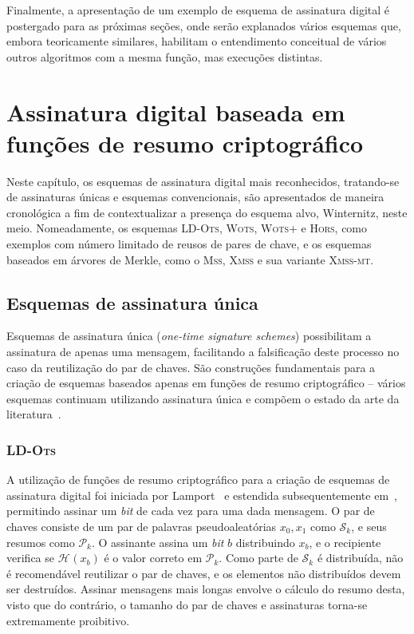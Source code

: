 \documentclass[12pt,notitlepage]{report}
\newcommand{\pk}{\mathcal{P}_k}
\newcommand{\sk}{\mathcal{S}_k}
\newcommand{\hash}[2][]{\mathcal{H}^{#1}(#2)}
\newcommand{\lots}{\textsc{LD-Ots}}
\newcommand{\wots}{\textsc{Wots}}
\newcommand{\wotsplus}{\textsc{Wots+}}
\newcommand{\hors}{\textsc{Hors}}
\newcommand{\mss}{\textsc{Mss}}
\newcommand{\xmss}{\textsc{Xmss}}
\newcommand{\xmssmt}{\textsc{Xmss-mt}}
\begin{document}
Finalmente, a apresentação de um exemplo de esquema de assinatura digital é
postergado para as próximas seções, onde serão explanados vários esquemas que,
embora teoricamente similares, habilitam o entendimento conceitual de vários
outros algoritmos com a mesma função, mas execuções distintas.

\chapter{Assinatura digital baseada em funções de resumo criptográfico}
\label{chapter:hashsig}

Neste capítulo, os esquemas de assinatura digital mais reconhecidos,
tratando-se de assinaturas únicas e esquemas convencionais, são apresentados
de maneira cronológica a fim de contextualizar a presença do esquema alvo,
Winternitz, neste meio. Nomeadamente, os esquemas \lots{}, \wots{},
\wotsplus{} e \hors{}, como exemplos com número limitado de reusos de pares
de chave, e os esquemas baseados em árvores de Merkle, como o \mss{}, \xmss{}
e sua variante \xmssmt{}.

\section{Esquemas de assinatura única}
\label{section:onetime}

Esquemas de assinatura única (\emph{one-time signature schemes}) possibilitam a
assinatura de apenas uma mensagem, facilitando a falsificação deste processo no
caso da reutilização do par de chaves. São construções fundamentais para a
criação de esquemas baseados apenas em funções de resumo criptográfico --
vários esquemas continuam utilizando assinatura única e compõem o estado da
arte da literatura~\cite{sphincsplus,irtf-cfrg-xmss-hash-based-signatures-12}.

\subsection{\lots{}}
\label{subsection:ldots}

A utilização de funções de resumo criptográfico para a criação de esquemas de
assinatura digital foi iniciada por Lamport~\cite{lamport1979constructing}
e estendida subsequentemente em~\cite{Diffie:2006:NDC:2263321.2269104, Merkle:1989:CDS:118209.118230},
permitindo assinar um \emph{bit} de cada vez para uma dada mensagem. O par de
chaves consiste de um par de palavras pseudoaleatórias $x_0, x_1$ como $\sk{}$,
e seus resumos como $\pk{}$. O assinante assina um \emph{bit} $b$ distribuindo
$x_b$, e o recipiente verifica se $\hash{x_b}$ é o valor correto em $\pk{}$.
Como parte de $\sk{}$ é distribuída, não é recomendável reutilizar o par de
chaves, e os elementos não distribuídos devem ser destruídos. Assinar mensagens
mais longas envolve o cálculo do resumo desta, visto que do contrário, o
tamanho do par de chaves e assinaturas torna-se extremamente proibitivo.
\end{document}
